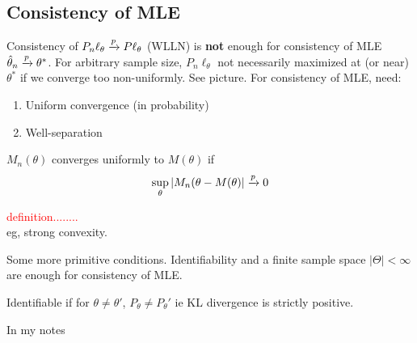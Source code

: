 \documentclass{article}
\newcommand\myworries[1]{\textcolor{red}{#1}}
\begin{document}
\subsection{Consistency of MLE}
Consistency of $P_n \ell_\theta \xrightarrow{p} P \ell_\theta $ (WLLN) is \textbf{not} enough for consistency of MLE $\hat \theta_n \xrightarrow{p} \theta^*$. For arbitrary sample size, $P_n \ell_\theta$ not necessarily maximized at (or near) $\theta^*$ if we converge too non-uniformly. See picture.  For consistency of MLE, need:
\begin{enumerate}
	\item Uniform convergence (in probability)
	\item Well-separation 
\end{enumerate}
\begin{definition}
$M_n(\theta)$ converges uniformly to $M(\theta)$ if 
$$\sup_{\theta} |M_n(\theta - M(\theta)| \xrightarrow{p} 0$$
\end{definition}
\begin{definition}
\myworries{definition........}\\
eg, strong convexity. 
\end{definition}
Some more primitive conditions. Identifiability and a finite sample space $|\Theta|<\infty$ are enough for consistency of MLE. 
\begin{definition}[Identifiability]
Identifiable if for $\theta \neq \theta'$, $P_\theta \neq P_\theta'$ ie KL divergence is strictly positive. 
\end{definition}
\begin{example}
In my notes
\end{example}
\end{document}
